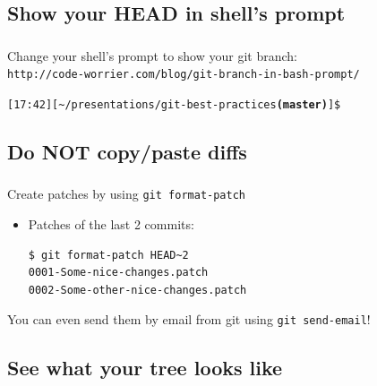
\subsection{Show your HEAD in shell's prompt}

\begin{frame}
  \frametitle{\insertsubsection}

  Change your shell's prompt to show your git branch:\\
  \texttt{\footnotesize http://code-worrier.com/blog/git-branch-in-bash-prompt/}

  \vspace*{20pt}
  \begin{footnotesize}
    \texttt{[17:42][\textasciitilde{}/presentations/git-best-practices{\color{myblue}\textbf{(master)}}]\$}
  \end{footnotesize}

\end{frame}


\subsection{Do NOT copy/paste diffs}

\begin{frame}[fragile]
  \frametitle{\insertsubsection}

  Create patches by using \texttt{git format-patch}

  \begin{itemize}
    \item Patches of the last 2 commits:
\begin{verbatim}
$ git format-patch HEAD~2
0001-Some-nice-changes.patch
0002-Some-other-nice-changes.patch
\end{verbatim}
  \end{itemize}

  You can even send them by email from git using \texttt{git send-email}!

\end{frame}


\subsection{See what your tree looks like}

